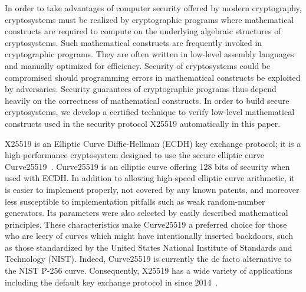 
In order to take advantages of computer security offered by modern 
cryptography, 
cryptosystems must be realized by cryptographic programs where mathematical
constructs are required to compute on the underlying algebraic
structures of cryptosystems.
Such mathematical constructs are frequently invoked in cryptographic
programs. They are often written in low-level assembly languages and
manually optimized for efficiency. 
Security of cryptosystems could be compromised should programming
errors in mathematical constructs be exploited by adversaries.
Security guarantees of cryptographic programs
thus depend heavily on the correctness of mathematical constructs.
In order to build secure cryptosystems, we develop a certified
technique to verify low-level mathematical constructs used in the
security protocol X25519 automatically in this paper.

X25519 is an Elliptic Curve Diffie-Hellman (ECDH) key exchange
protocol; it is a high-performance cryptosystem designed to 
use the secure elliptic curve Curve25519~\cite{Ber06}. Curve25519 is an elliptic
curve offering 128 bits of security when used with ECDH. In addition
to allowing high-speed elliptic curve arithmetic, it is easier to
implement properly, not covered by any known patents, and moreover
less susceptible to implementation pitfalls such as weak 
random-number generators. Its parameters were also selected by
easily described mathematical principles.
These characteristics make Curve25519 a
preferred choice for those who are leery of curves which might have
intentionally inserted
backdoors, such as those standardized by the United States National
Institute of Standards and Technology (NIST). 
Indeed, Curve25519 is currently the
de facto alternative to the NIST P-256 curve. Consequently, X25519 has
a wide variety of applications including the default key exchange
protocol in \openssh since 2014~\cite{W:17:C}.

